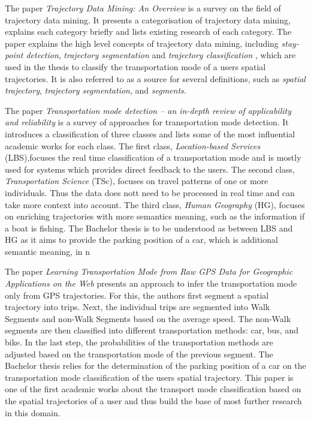 The paper \textit{Trajectory Data Mining: An Overview} \cite{Zheng:2015:TDM:2764959.2743025} is a survey on the field of trajectory data mining. It presents a categorisation of trajectory data mining, explains each category briefly and lists existing research of each category.\newline
The paper explains the high level concepts of trajectory data mining, including \textit{stay-point detection}, \textit{trajectory segmentation} and \textit{trajectory classification} , which are used in the thesis to classify the transportation mode of a users spatial trajectories. It is also referred to as a source for several definitions, such as \textit{spatial trajectory}, \textit{trajectory segmentation},  and \textit{segments}.

The paper \textit{Transportation mode detection – an in-depth review of applicability and reliability} \cite{Prelipcean2017} is a survey of approaches for transportation mode detection. It introduces a classification of three classes and lists some of the most influential academic works for each class. The first class, \textit{Location-based Services} (LBS),focuses the real time classification of a transportation mode and is mostly used for systems which provides direct feedback to the users. The second class, \textit{Transportation Science} (TSc), focuses on travel patterns of one or more individuals. Thus the data does nott need to be processed in real time and can take more context into account. The third class, \textit{Human Geography} (HG), focuses on enriching trajectories with more semantics meaning, such as the information if a boat is fishing.\newline
The Bachelor thesis is to be understood as between LBS and HG as it aims to provide the parking position of a car, which is additional semantic meaning, in n

The paper \textit{Learning Transportation Mode from Raw GPS Data for Geographic Applications on the Web} \cite{Zheng2008} presents an approach to infer the transportation mode only from GPS trajectories. For this, the authors first segment a spatial trajectory into trips. Next, the individual trips are segmented into Walk Segments and non-Walk Segments based on the average speed. The non-Walk segments are then classified into different transportation methods: car, bus, and bike. In the last step, the probabilities of the transportation methods are adjusted based on the transportation mode of the previous segment. \newline
The Bachelor thesis relies for the determination of the parking position of a car on the transportation mode classification of the users spatial trajectory. This paper is one of the first academic works about the transport mode classification based on the spatial trajectories of a user and thus build the base of most further research in this domain.


